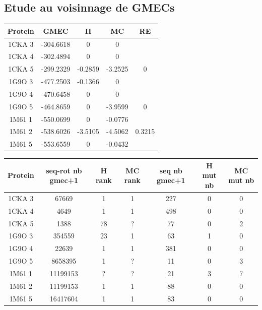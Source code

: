\documentclass[a4paper,12pt]{article}
\begin{document}
   \subsection{ Etude au voisinnage de GMECs}


    \begin{table}[h]
      \centering

      \begin{tabular}{|c|c|c|c|c|}


        \hline
        Protein & GMEC & H & MC & RE \\
        \hline
        1CKA 3 & -304.6618 & 0 & 0 & \\
        1CKA 4 & -302.4894 & 0 & 0 & \\
        1CKA 5 & -299.2329 & -0.2859 & -3.2525 & 0 \\
        1G9O 3 & -477.2503 & -0.1366 & 0 & \\
        1G9O 4 & -470.6458 & 0 & 0 & \\
        1G9O 5 & -464.8659 & 0 & -3.9599 &  0 \\
        1M61 1 & -550.0699 & 0 & -0.0776 & \\
        1M61 2 & -538.6026 & -3.5105 & -4.5062 & 0.3215 \\
        1M61 5 & -553.6559 & 0 & -0.0432 & \\
        
        \hline


 \end{tabular}      
 \label{tab_1}      
\end{table}


    \begin{table}[h]
      \centering

      \begin{tabular}{|c|c|c|c|c|c|c|}


        \hline
        Protein & seq-rot nb gmec+1 & H rank  & MC rank  & seq nb gmec+1 & H mut nb & MC mut nb \\
        \hline
        1CKA 3 & 67669 & 1 & 1 & 227 & 0 & 0 \\
        1CKA 4 & 4649 & 1 & 1 & 498 & 0 & 0 \\
        1CKA 5 & 1388 & 78 & ? & 77 & 0 & 2 \\
        1G9O 3 & 354559 & 23 & 1 & 63 & 1 & 0 \\
        1G9O 4 & 22639 & 1 & 1 & 381 & 0 & 0 \\
        1G9O 5 & 8658395 & 1 & ? &  11 & 0 & 3 \\
        1M61 1 & 11199153 & ? & ? & 21 & 3 & 7 \\
        1M61 2 & 11199153 & 1 & 1 & 88 & 0 & 0 \\
        1M61 5 & 16417604 & 1 & 1 & 83 & 0 & 0 \\
        
        \hline


 \end{tabular}      
 \label{tab_2}      
\end{table}
\end{document}
